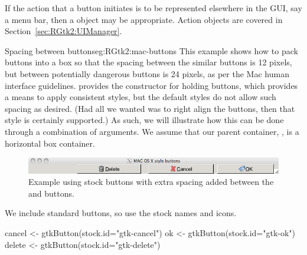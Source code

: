 If the action that a button initiates is to be represented elsewhere
in the GUI, say a menu bar, then a  object may be
appropriate. Action objects are covered in
Section~\ref{sec:RGtk2:UIManager}.

\begin{example}{Spacing between buttons}{eg:RGtk2:mac-buttons}
This example shows how to pack buttons into a box so that the spacing
between the similar buttons is 12 pixels, but between potentially
dangerous buttons is 24 pixels, as per the Mac human interface
guidelines.
\GTK\/ provides the constructor  for
holding buttons, which provides a means to apply consistent styles,
but the default styles do not allow such spacing as desired. (Had all
we wanted was to right align the buttons, then that style is certainly
supported.) As such, we will illustrate how this can be done through a
combination of  arguments.
We assume that our parent container, , is a
horizontal box container.


\begin{figure}
  \centering
  \includegraphics[width=.85\textwidth]{ex-RGtk2-mac-buttons}
  \caption{Example using stock buttons with extra spacing added between the  and  buttons.}
  \label{fig:ex-RGtk2-mac-buttons}
\end{figure}

We include standard buttons, so use the stock names and icons.
\begin{Schunk}
\begin{Sinput}
 cancel <- gtkButton(stock.id="gtk-cancel")
 ok <- gtkButton(stock.id="gtk-ok")
 delete <- gtkButton(stock.id="gtk-delete")
\end{Sinput}
\end{Schunk}


\end{example}
